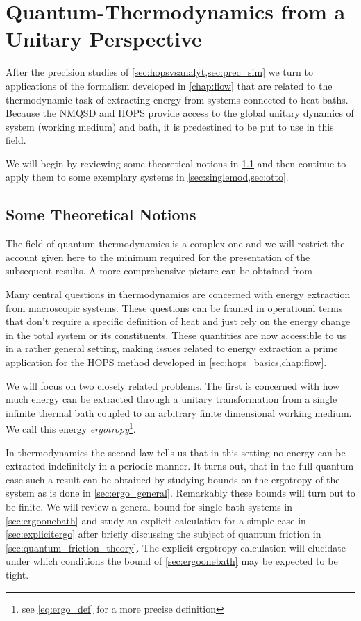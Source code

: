 \chapter{Quantum-Thermodynamics from a Unitary Perspective}
\label{sec:therm_results}
After the precision studies of \cref{sec:hopsvsanalyt,sec:prec_sim} we
turn to applications of the formalism developed in \cref{chap:flow}
that are related to the thermodynamic task of extracting energy from
systems connected to heat baths. Because the NMQSD and HOPS provide
access to the global unitary dynamics of system (working medium) and
bath, it is predestined to be put to use in this field.

We will begin by reviewing some theoretical notions in
\cref{sec:basic_thermo} and then continue to apply them to some
exemplary systems in \cref{sec:singlemod,sec:otto}.

\section{Some Theoretical Notions}
\label{sec:basic_thermo}
The field of quantum thermodynamics is a complex one and we will
restrict the account given here to the minimum required for the
presentation of the subsequent results. A more comprehensive picture
can be obtained from
\cite{Binder2018,Kurizki2021Dec,Talkner2020Oct,Vinjanampathy2016Oct}.

Many central questions in thermodynamics are concerned with energy
extraction from macroscopic systems. These questions can be framed in
operational terms that don't require a specific definition of heat and
just rely on the energy change in the total system or its
constituents. These quantities are now accessible to us in a rather
general setting, making issues related to energy extraction a prime
application for the HOPS method developed in
\cref{sec:hops_basics,chap:flow}.

We will focus on two closely related problems. The first is concerned
with how much energy can be extracted through a unitary transformation
from a single infinite thermal bath coupled to an arbitrary finite
dimensional working medium. We call this energy
\emph{ergotropy}\footnote{see \cref{eq:ergo_def} for a more precise
  definition}.

In thermodynamics the second law tells us that in this setting no
energy can be extracted indefinitely in a periodic manner.  It turns
out, that in the full quantum case such a result can be obtained by
studying bounds on the ergotropy of the system as is done in
\cref{sec:ergo_general}. Remarkably these bounds will turn out to be
finite. We will review a general bound for single bath systems in
\cref{sec:ergoonebath} and study an explicit calculation for a simple
case in \cref{sec:explicitergo} after briefly discussing the subject
of quantum friction in \cref{sec:quantum_friction_theory}. The
explicit ergotropy calculation will elucidate under which conditions
the bound of \cref{sec:ergoonebath} may be expected to be tight.

